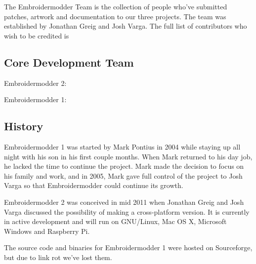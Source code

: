 The Embroidermodder Team is the collection of people who've submitted
patches, artwork and documentation to our three projects.
The team was established by Jonathan Greig and Josh Varga.
The full list of contributors who wish to be credited is

\subsection{Core Development Team}

Embroidermodder 2:


Embroidermodder 1:


\subsection{History}

Embroidermodder 1 was started by Mark Pontius in 2004 while staying up all night
with his son in his first couple months. When Mark returned to his day job,
he lacked the time to continue the project. Mark made the decision to focus on his
family and work, and in 2005, Mark gave full control of the project to Josh Varga
so that Embroidermodder could continue its growth.

Embroidermodder 2 was conceived in mid 2011 when Jonathan Greig and Josh Varga
discussed the possibility of making a cross-platform version. It is currently in
active development and will run on GNU/Linux, Mac OS X, Microsoft Windows and Raspberry Pi.

The source code and binaries for Embroidermodder 1 were hosted on Sourceforge, but
due to link rot we've lost them.

